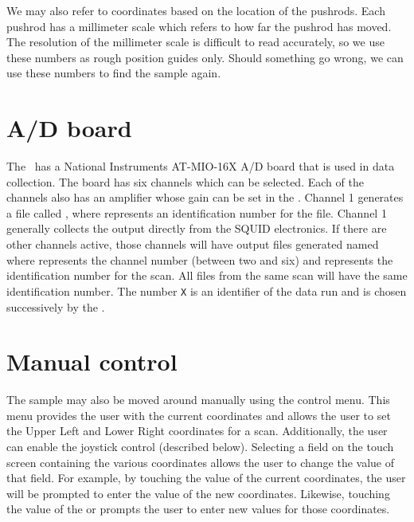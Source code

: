 We may also refer to coordinates based on the location of the 
pushrods. Each pushrod has a millimeter scale which refers to 
how far the pushrod has moved. The resolution of the millimeter
scale is difficult to read accurately, so we use these numbers
as rough position guides only. Should something go wrong, we can
use these numbers to find the sample again. 


\section{A/D board}
\label{adbrd}
The \squidbox\  has a National Instruments AT-MIO-16X A/D board
that is used in data collection\cite{national_instruments}.
The board has six channels which can be selected. Each of the
channels also has an amplifier whose gain can be set in the \squidbox. 
Channel 1 generates a file called , where 
 represents an identification number for the file. 
Channel 1 generally collects the output directly from the SQUID
electronics.
If there are other channels active, those channels will
have output files generated named  where
 represents the channel number (between two
and six) and 
represents the identification number for the scan. All files
from the same scan will have the same identification number. 
The number \texttt{X} is an identifier of the data run and is
chosen successively by the \squidbox. 

\section{Manual control}

The sample may also be moved around manually using the 
 control
menu. This menu provides the user with the current coordinates and
allows the user to set the Upper Left and Lower Right coordinates
for a scan. Additionally, the user can enable the joystick control
(described below). Selecting a field on the touch
screen containing the various coordinates allows the user to change the 
value of that field. For example, by touching the value of the
current coordinates, the user will be prompted to enter the value
of the new coordinates. Likewise, touching the value of the 
or  prompts the user to enter new values for 
those coordinates. 

